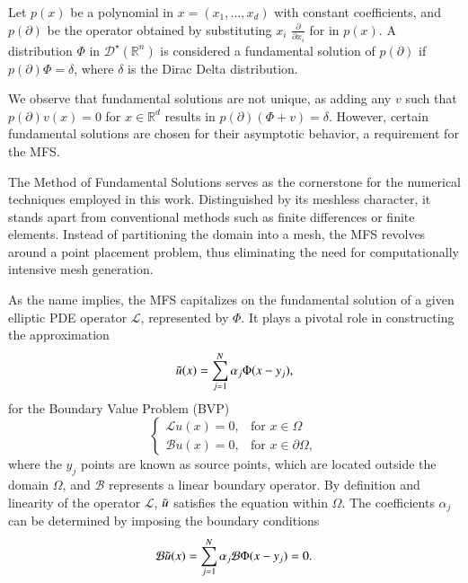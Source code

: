 \documentclass[5p,authoryear]{elsarticle}
\begin{document}
Let $p(x)$ be a polynomial in $x=(x_1,\dots,x_d)$ with constant coefficients, and $p(\partial)$ be the operator obtained by substituting $x_i$ $\frac{\partial}{\partial x_i}$ for in $p(x)$. A distribution $\Phi$ in $\mathcal{D}^\star(\mathbb{R}^n)$ is considered a fundamental solution of $p(\partial)$ if $p(\partial) \Phi = \delta$, where $\delta$ is the Dirac Delta distribution.

We observe that fundamental solutions are not unique, as adding any $v$ such that $p(\partial) v(x) = 0$ for $x \in \mathbb{R}^d$ results in $p(\partial) (\Phi + v) = \delta$. However, certain fundamental solutions are chosen for their asymptotic behavior, a requirement for the MFS.

The Method of Fundamental Solutions serves as the cornerstone for the numerical techniques employed in this work. Distinguished by its meshless character, it stands apart from conventional methods such as finite differences or finite elements. Instead of partitioning the domain into a mesh, the MFS revolves around a point placement problem, thus eliminating the need for computationally intensive mesh generation.

As the name implies, the MFS capitalizes on the fundamental solution of a given elliptic PDE operator \(\mathcal{L}\), represented by $\Phi$. It plays a pivotal role in constructing the approximation
\begin{equation}\label{chapt_numerical_mfs_approx_intro}
    \Tilde{u}(x) = \sum_{j=1}^{N}\alpha_j \Phi(x-y_j),
\end{equation}
for the Boundary Value Problem (BVP)
\begin{equation}\label{general_elliptic_problem}
    \begin{cases}
        \mathcal{L}u(x) = 0, & \text{for } x \in \Omega\\
        \mathcal{B}u(x) = 0, & \text{for } x \in \partial\Omega,
    \end{cases}
\end{equation}
where the $y_j$ points are known as source points, which are located outside the domain \(\Omega\), and $\mathcal{B}$ represents a linear boundary operator. By definition and linearity of the operator $\mathcal{L}$, $\Tilde{u}$ satisfies the equation within $\Omega$. The coefficients $\alpha_j$ can be determined by imposing the boundary conditions
\[
\mathcal{B}\Tilde{u}(x) = \sum_{j=1}^{N}\alpha_j \mathcal{B}\Phi(x-y_j) = 0.
\]
\end{document}
